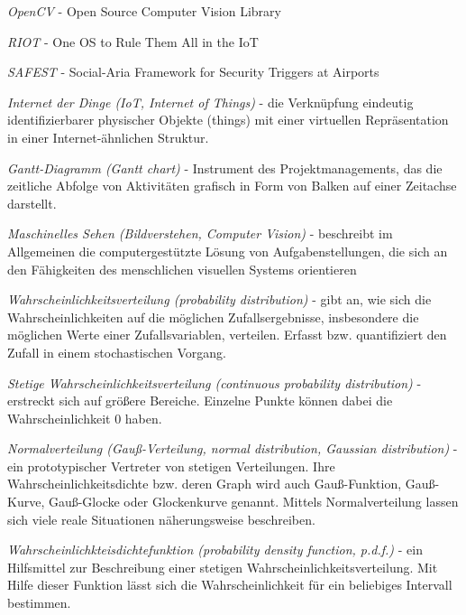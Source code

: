 \documentclass[10pt,a4paper]{article}
\begin{document}
\begin {description}

\item {\it OpenCV} - Open Source Computer Vision Library

\item {\it RIOT} - One OS to Rule Them All in the IoT

\item {\it SAFEST} - Social-Aria Framework for Security Triggers at Airports

\item {\it Internet der Dinge (IoT, Internet of Things)} - die Verknüpfung eindeutig identifizierbarer physischer Objekte (things) mit einer virtuellen Repräsentation in einer Internet-ähnlichen Struktur.

\item {\it Gantt-Diagramm (Gantt chart)} - Instrument des Projektmanagements, das die zeitliche Abfolge von Aktivitäten grafisch in Form von Balken auf einer Zeitachse darstellt. 

\item {\it Maschinelles Sehen (Bildverstehen, Computer Vision)} - beschreibt im Allgemeinen die computergestützte Lösung von Aufgabenstellungen, die sich an den Fähigkeiten des menschlichen visuellen Systems orientieren

\item {\it Wahrscheinlichkeitsverteilung (probability distribution)} - gibt an, wie sich die Wahrscheinlichkeiten auf die möglichen Zufallsergebnisse, insbesondere die möglichen Werte einer Zufallsvariablen, verteilen. Erfasst bzw. quantifiziert den Zufall in einem stochastischen Vorgang.

\item {\it Stetige Wahrscheinlichkeitsverteilung (continuous probability distribution)} - erstreckt sich auf größere Bereiche. Einzelne Punkte können dabei die Wahrscheinlichkeit 0 haben. 

\item {\it Normalverteilung (Gauß-Verteilung, normal distribution, Gaussian distribution)} - ein prototypischer Vertreter von stetigen Verteilungen. Ihre Wahrscheinlichkeitsdichte bzw. deren Graph wird auch Gauß-Funktion, Gauß-Kurve, Gauß-Glocke oder Glockenkurve genannt. Mittels Normalverteilung lassen sich viele reale Situationen näherungsweise beschreiben.

\item {\it Wahrscheinlichkteisdichtefunktion (probability density function, p.d.f.)} - ein Hilfsmittel zur Beschreibung einer stetigen Wahrscheinlichkeitsverteilung. Mit Hilfe dieser Funktion lässt sich die Wahrscheinlichkeit für ein beliebiges Intervall bestimmen. 


\end{description}
\end{document}
